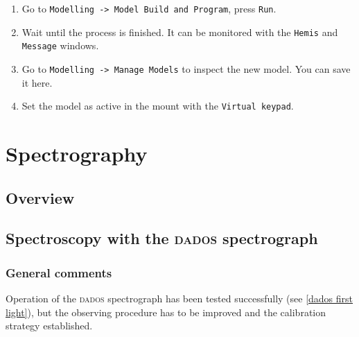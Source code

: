 \documentclass[a4paper, 11pt, fleqn]{memoir}
\begin{document}
\begin{enumerate}
\begin{itemize}
          \end{itemize}
    \item
          Go to \texttt{Modelling -> Model Build and Program}, press \texttt{Run}.
    \item
          Wait until the process is finished.
          It can be monitored with the \texttt{Hemis} and \texttt{Message} windows.
    \item
          Go to \texttt{Modelling -> Manage Models} to inspect the new model.
          You can save it here.
    \item
          Set the model as active in the mount with the \texttt{Virtual keypad}.
\end{enumerate}

\chapter{Spectrography}

\section{Overview}

\section{Spectroscopy with the \textsc{dados} spectrograph}\label{spectroscopy}

\subsection{General comments}

Operation of the \textsc{dados} spectrograph has been tested successfully (see \cref{dados first light}), but the observing procedure has to be improved and the calibration strategy established.
\end{document}
